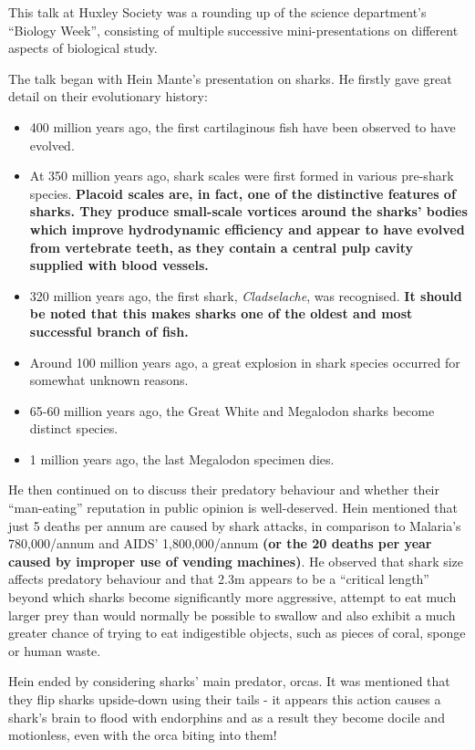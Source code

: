 \documentclass[11pt,a4paper]{report}
\begin{document}
\begin{multicols}{2}

This talk at Huxley Society was a rounding up of the science
department's ``Biology Week'', consisting of multiple successive
mini-presentations on different aspects of biological study.

The talk began with Hein Mante's presentation on sharks. He firstly gave
great detail on their evolutionary history:

\begin{itemize}
	\item
	400 million years ago, the first cartilaginous fish have been observed
	to have evolved.
	\item
	At 350 million years ago, shark scales were first formed in various
	pre-shark species.
	\textbf{Placoid scales are, in fact, one of the distinctive features of sharks. They produce small-scale vortices around the sharks’ bodies which improve hydrodynamic efficiency and appear to have evolved from vertebrate teeth, as they contain a central pulp cavity supplied with blood vessels.}
	\item
	320 million years ago, the first shark, \textit{Cladselache}, was
	recognised.
	\textbf{It should be noted that this makes sharks one of the oldest and most successful branch of fish.}
	\item
	Around 100 million years ago, a great explosion in shark species
	occurred for somewhat unknown reasons.
	\item
	65-60 million years ago, the Great White and Megalodon sharks become
	distinct species.
	\item
	1 million years ago, the last Megalodon specimen dies.
\end{itemize}

He then continued on to discuss their predatory behaviour and whether
their ``man-eating'' reputation in public opinion is well-deserved. Hein
mentioned that just 5 deaths per annum are caused by shark attacks, in
comparison to Malaria's 780,000/annum and AIDS' 1,800,000/annum
\textbf{(or the 20 deaths per year caused by improper use of vending machines)}.
He observed that shark size affects predatory behaviour and that 2.3m
appears to be a ``critical length'' beyond which sharks become
significantly more aggressive, attempt to eat much larger prey than
would normally be possible to swallow and also exhibit a much greater
chance of trying to eat indigestible objects, such as pieces of coral,
sponge or human waste.

Hein ended by considering sharks' main predator, orcas. It was mentioned
that they flip sharks upside-down using their tails - it appears this
action causes a shark's brain to flood with endorphins and as a result
they become docile and motionless, even with the orca biting into them!


\end{multicols}
\end{document}
